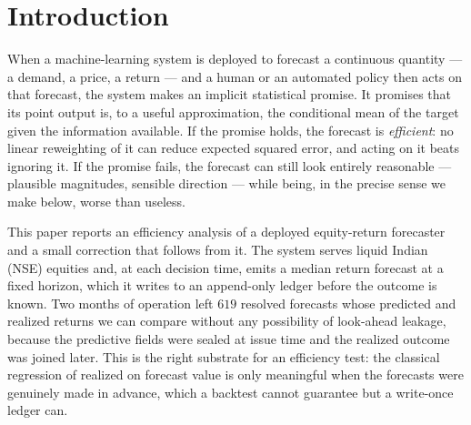 \documentclass[10pt,twocolumn,twoside]{eec_style}
\begin{document}

\section{Introduction}
\label{sec:intro}
When a machine-learning system is deployed to forecast a continuous quantity --- a
demand, a price, a return --- and a human or an automated policy then acts on that
forecast, the system makes an implicit statistical promise. It promises that its point
output is, to a useful approximation, the conditional mean of the target given the
information available. If the promise holds, the forecast is \emph{efficient}: no
linear reweighting of it can reduce expected squared error, and acting on it beats
ignoring it. If the promise fails, the forecast can still look entirely reasonable ---
plausible magnitudes, sensible direction --- while being, in the precise sense we make
below, worse than useless.

This paper reports an efficiency analysis of a deployed equity-return forecaster and a
small correction that follows from it. The system serves liquid Indian (NSE) equities and,
at each decision time, emits a median return forecast at a fixed horizon, which it
writes to an append-only ledger before the outcome is known. Two months of operation
left $619$ resolved forecasts whose predicted and realized returns we can compare
without any possibility of look-ahead leakage, because the predictive fields were
sealed at issue time and the realized outcome was joined later. This is the right
substrate for an efficiency test: the classical regression of realized on forecast
value \cite{mincer1969,theil1966} is only meaningful when the forecasts were genuinely
made in advance, which a backtest cannot guarantee but a write-once ledger can.
\end{document}
